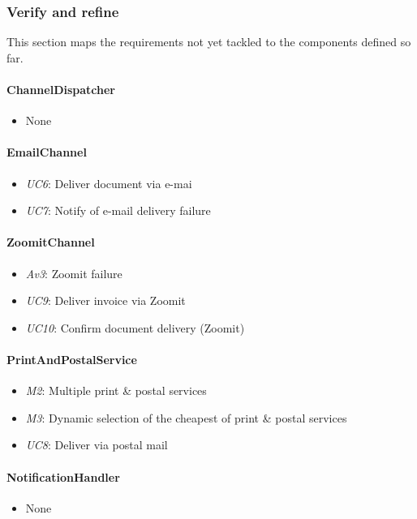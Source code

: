 \documentclass[a4paper,10pt]{article}
\begin{document}
\subsubsection{Verify and refine}
This section maps the requirements not yet tackled to the components defined so far.
\paragraph{ChannelDispatcher}
\begin{itemize}
	\item None
\end{itemize}

\paragraph{EmailChannel}
\begin{itemize}
	\item \emph{UC6}: Deliver document via e-mai
	\item \emph{UC7}: Notify of e-mail delivery failure
\end{itemize}

\paragraph{ZoomitChannel}
\begin{itemize}
	\item \emph{Av3}: Zoomit failure
	\item \emph{UC9}: Deliver invoice via Zoomit
	\item \emph{UC10}: Confirm document delivery (Zoomit)
\end{itemize}

\paragraph{PrintAndPostalService}
\begin{itemize}
	\item \emph{M2}: Multiple print \& postal services
	\item \emph{M3}: Dynamic selection of the cheapest of print \& postal services
	\item \emph{UC8}: Deliver via postal mail
\end{itemize}

\paragraph{NotificationHandler}
\begin{itemize}
	\item None
\end{itemize}
\end{document}
